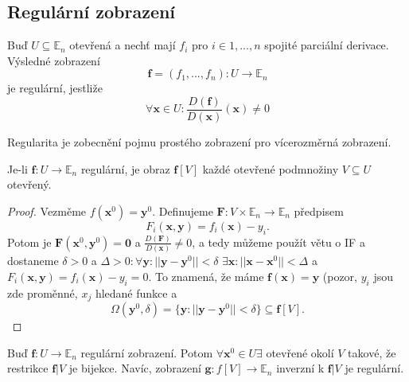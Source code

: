 \documentclass[../main.tex]{subfiles}
\begin{document}
\subsection{Regulární zobrazení}
\begin{definition}
	Buď $U \subseteq \mathbb{E}_n$ otevřená a nechť mají $f_i$ pro $i \in {1, ... , n}$
	spojité parciální derivace. Výsledné zobrazení
	\[ \mathbf{f} = (f_1, ... , f_n): U \to \mathbb{E}_n \]
	je regulární, jestliže
	\[ \forall \mathbf{x} \in U: \frac{D(\mathbf{f})}{D(\mathbf{x})}(\mathbf{x}) \neq 0 \]
\end{definition}

\begin{intuition}
	Regularita je zobecnění pojmu prostého zobrazení pro vícerozměrná zobrazení.
\end{intuition}

\begin{lemma}
	Je-li $\mathbf{f}: U \to \mathbb{E}_n$ regulární, je obraz $\mathbf{f}[V]$ každé otevřené podmnožiny
	$V \subseteq U$ otevřený.
\end{lemma}

\begin{proof}
	Vezměme $f(\textbf{x}^0) = \textbf{y}^0.$ Definujeme $\textbf{F} : V \times \mathbb{E}_n \rightarrow \mathbb{E}_n$ předpisem
	\[F_i(\textbf{x},\textbf{y}) = f_i(\textbf{x}) - y_i.\]
	Potom je $\textbf{F}(\textbf{x}^0,\textbf{y}^0) = \textbf{0}$
	a $\frac{D(\textbf{F})}{D(\textbf{x})} \neq 0$, 
	a tedy můžeme použít větu o IF a dostaneme 
	$\delta > 0$ a $\Delta > 0 : \forall \textbf{y} : ||\textbf{y} - \textbf{y}^0|| < \delta$ $\exists \textbf{x} : ||\textbf{x} - \textbf{x}^0|| < \Delta$ a 
	$F_i(\textbf{x},\textbf{y}) = f_i(\textbf{x}) - y_i = 0$. To znamená, že máme $\textbf{f}(\textbf{x}) = \textbf{y}$ (pozor, $y_i$ jsou zde proměnné, $x_j$ hledané funkce a
	\[\Omega(\textbf{y}^0,\delta) = \{\textbf{y} : ||\textbf{y} - \textbf{y}^0 || < \delta \} \subseteq \textbf{f}[V].\]
\end{proof}

\begin{lemma}
	Buď $\mathbf{f}: U \to \mathbb{E}_n$ regulární zobrazení. Potom $\forall \mathbf{x}^0 \in U \exists$
	otevřené okolí $V$ takové, že restrikce $\mathbf{f}|V$ je bijekce. Navíc, zobrazení
	$\mathbf{g}: f[V] \to \mathbb{E}_n$ inverzní k $\mathbf{f}|V$ je regulární.
\end{lemma}
\end{document}
